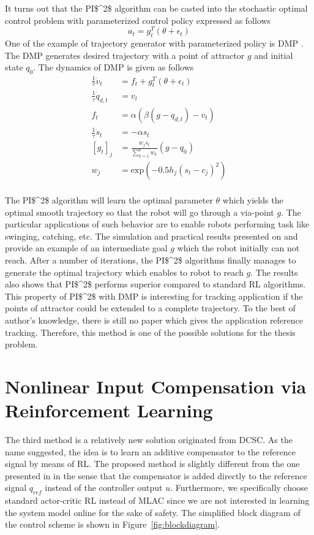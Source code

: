 It turns out that the \acs{PI$^2$} algorithm can be casted into the stochastic optimal control problem with parameterized control policy expressed as follows
\begin{equation}
a_t = g_t^T(\theta+\epsilon_t)
\end{equation}
One of the example of trajectory generator with parameterized policy is \acs {DMP} \cite{ijspeert2002learning}. The \acs{DMP} generates desired trajectory with a point of attractor $g$ and initial state $q_0$. The dynamics of \acs {DMP} is given as follows
\begin{align}
\frac{1}{\tau} \dot{v}_t &= f_t + g^T_t(\theta+\epsilon_t) \\
\frac{1}{\tau} \dot{q}_{d,t} &= v_t \\
f_t &= \alpha(\beta(g-q_{d,t})-v_t)\\
\frac{1}{\tau}\dot{s}_t &= -\alpha s_t\\
[g_t]_j &= \frac{w_js_t}{\sum_{k=1}^{p}w_k}(g-q_0)\\
w_j &= \text{exp}(-0.5h_j(s_t-c_j)^2)\\
\end{align}

The \acs{PI$^2$} algorithm will learn the optimal parameter $\theta$ which yields the optimal smooth trajectory so that the robot will go through a via-point $g$. The particular applications of such behavior are to enable robots performing task like swinging, catching, etc. The simulation and practical results presented on \cite{Buchli2010} and \cite{Buchli6037312} provide an example of an intermediate goal $g$ which the robot initially can not reach. After a number of iterations, the \acs{PI$^2$} algorithms finally manages to generate the optimal trajectory which enables to robot to reach $g$. The results also shows that \acs{PI$^2$} performs superior compared to standard \acs {RL} algorithms. This property of \acs{PI$^2$} with \acs {DMP} is interesting for tracking application if the points of attractor could be extended to a complete trajectory. To the best of author's knowledge, there is still no paper which gives the application reference tracking. Therefore, this method is one of the possible solutions for the thesis problem.

\section{Nonlinear Input Compensation via Reinforcement Learning} \label{sec:nl_comp}
The third method is a relatively new solution originated from \acs {DCSC}. As the name suggested, the idea is to learn an additive compensator to the reference signal by means of \acs{RL}. The proposed method is slightly different from the one presented in \cite{Efe2014} in the sense that the compensator is added directly to the reference signal $q_{ref}$ instead of the controller output $ u $. Furthermore, we specifically choose standard actor-critic \acs{RL} instead of \ac{MLAC} since we are not interested in learning the system model online for the sake of safety. The simplified block diagram of the control scheme is shown in Figure~\ref{fig:blockdiagram}. 

